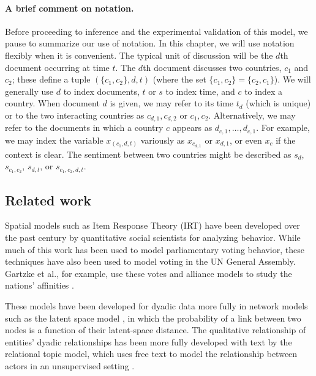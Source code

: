 \paragraph{A brief comment on notation.} Before proceeding to
inference and the experimental validation of this model, we pause to
summarize our use of notation.  In this chapter, we will use notation
flexibly when it is convenient.  The typical unit of discussion will
be the $d$th document occurring at time $t$.  The $d$th document
discusses two countries, $c_1$ and $c_2$; these define a tuple $(\{
c_1, c_2 \}, d, t)$ (where the set $\{ c_1, c_2 \} = \{ c_2, c_1 \}$).
We will generally use $d$ to index documents, $t$ or $s$ to index
time, and $c$ to index a country.  When document $d$ is given, we may
refer to its time $t_d$ (which is unique) or to the two interacting
countries as $c_{d,1},c_{d,2}$ or $c_1,c_2$.  Alternatively, we may
refer to the documents in which a country $c$ appears as $d_{c,1},
\ldots, d_{c,1}$.  For example, we may index the variable
$x_{(c_1,d,t)}$ variously as $x_{c_{d,1}}$ or $x_{d,1}$, or even $x_c$
if the context is clear. The sentiment between two countries might be
described as $s_d$, $s_{c_1,c_2}$, $s_{d,t}$, or $s_{c_1,c_2,d,t}$.

\subsection{Related work}

Spatial models such as Item Response Theory (IRT) have been developed
over the past century by quantitative social scientists for analyzing
behavior.  While much of this work has been used to model
parliamentary voting behavior, these techniques have also been used to
model voting in the UN General Assembly. Gartzke et al., for example,
use these votes and alliance models to study the nations' affinities
\cite{gartzke:1998}.

These models have been developed for dyadic data more fully in network
models such as the latent space model \cite{hoff:2002,sarkar:2005}, in
which the probability of a link between two nodes is a function of
their latent-space distance.  The qualitative relationship of
entities' dyadic relationships has been more fully developed with text
by the relational topic model, which uses free text to model the
relationship between actors in an unsupervised setting
\cite{chang:2009}.


